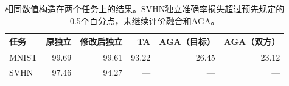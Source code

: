 \begin{table}[t]
\centering
\caption{相同数值构造在两个任务上的结果。SVHN独立准确率损失超过预先规定的0.5个百分点，未继续评价融合和AGA。}
\label{tab:numeric_task_transfer}
\begin{tabular}{lrrrrr}
\toprule
任务 & 原独立 & 修改后独立 & TA & AGA（目标） & AGA（双方） \\
\midrule
MNIST & 99.69 & 99.61 & 93.22 & 26.45 & 23.12 \\
SVHN  & 97.46 & 94.27 & --- & --- & --- \\
\bottomrule
\end{tabular}
\end{table}
